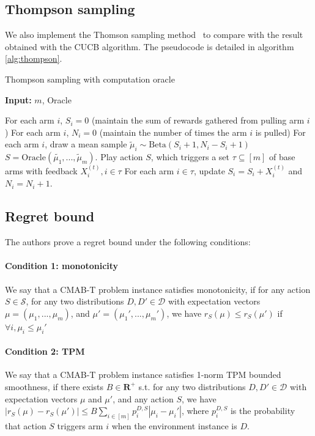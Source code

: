 \documentclass[a4paper,12pt]{article}
\begin{document}
\subsection{Thompson sampling}

We also implement the Thomson sampling method~\cite{thompson1933likelihood} to compare with the result obtained with the CUCB algorithm. The pseudocode is detailed in algorithm \ref{alg:thompson}.

\begin{algorithm}
\caption{Thompson sampling with computation oracle}\label{alg:thompson}
\hspace*{\algorithmicindent} \textbf{Input: } $m$, Oracle
\begin{algorithmic}[1]
\State For each arm $i$, $S_i = 0$ (maintain the sum of rewards gathered from pulling arm $i$)
\State For each arm $i$, $N_i = 0$ (maintain the number of times the arm $i$ is pulled)
\State For each arm $i$, draw a mean sample $\tilde{\mu}_i \sim \text{Beta}(S_i + 1, N_i - S_i + 1)$
\State $S = \text{Oracle}(\tilde{\mu_1}, ..., \tilde{\mu}_m)$.
\State Play action $S$, which triggers a set $\tau \subseteq[m]$ of base arms with feedback $X_i^{(t)}, i\in\tau$
\State For each arm $i\in\tau$, update $S_i = S_i + X_i^{(t)}$ and $N_i = N_i + 1$.
\EndFor
\end{algorithmic}
\end{algorithm}

\subsection{Regret bound}

The authors prove a regret bound under the following conditions: 
\paragraph{Condition 1: monotonicity}
We say that a CMAB-T problem instance satisfies monotonicity, if for any action $S\in\mathcal{S}$, for any two distributions $D, D'\in\mathcal{D}$ with expectation vectors $\mu = (\mu_1, ..., \mu_m)$, and $\mu' = (\mu_1', ..., \mu_m')$, we have $r_S(\mu) \leq r_S(\mu')$ if $\forall i, \mu_i\leq \mu_i'$

\paragraph{Condition 2: TPM}
We say that a CMAB-T problem instance satisfies 1-norm TPM bounded smoothness, if there exists $B\in\mathbf{R}^+$ s.t. for any two distributions $D, D'\in\mathcal{D}$ with expectation vectors $\mu$ and $\mu'$, and any action $S$, we have $|r_S(\mu)-r_S(\mu')| \leq B\sum_{i\in[m]}p_i^{D,S} |\mu_i-\mu_i'|$, where $p_i^{D, S}$ is the probability that action $S$ triggers arm $i$ when the environment instance is $D$.
\end{document}
